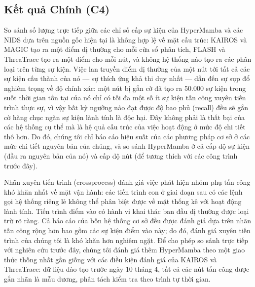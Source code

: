 \documentclass[letterpaper,twocolumn,10pt]{article}
\begin{document}
\subsection{Kết quả Chính (C4)}
\label{sec:main_results}

So sánh số lượng trực tiếp giữa các chỉ số cấp sự kiện của HyperMamba và các NIDS dựa trên nguồn gốc hiện tại là không hợp lệ về mặt cấu trúc: KAIROS và MAGIC tạo ra một điểm dị thường cho mỗi cửa sổ phân tích, FLASH và ThreaTrace tạo ra một điểm cho mỗi nút, và không hệ thống nào tạo ra các phân loại trên từng sự kiện. Việc lan truyền điểm dị thường của một nút tới tất cả các sự kiện cấu thành của nó --- sự thích ứng khả thi duy nhất --- dẫn đến sự sụp đổ nghiêm trọng về độ chính xác: một nút bị gắn cờ đã tạo ra 50.000 sự kiện trong suốt thời gian tồn tại của nó chỉ có tối đa một số ít sự kiện tấn công xuyên tiến trình thực sự, vì vậy bất kỳ ngưỡng nào đạt được độ bao phủ (recall) đều sẽ gắn cờ hàng chục ngàn sự kiện lành tính là độc hại. Đây không phải là thất bại của các hệ thống cụ thể mà là hệ quả cấu trúc của việc hoạt động ở mức độ chi tiết thô hơn. Do đó, chúng tôi chỉ báo cáo hiệu suất của các phương pháp cơ sở ở các mức chi tiết nguyên bản của chúng, và so sánh HyperMamba ở cả cấp độ sự kiện (đầu ra nguyên bản của nó) và cấp độ nút (để tương thích với các công trình trước đây).

Nhãn xuyên tiến trình (crossprocess) đánh giá việc phát hiện nhóm phụ tấn công khó khăn nhất về mặt vận hành: các tiến trình con ở giai đoạn sau có các lệnh gọi hệ thống riêng lẻ không thể phân biệt được về mặt thống kê với hoạt động lành tính. Tiến trình điểm vào có hành vi khai thác ban đầu dị thường được loại trừ rõ ràng. Cả báo cáo của bốn hệ thống cơ sở đều được đánh giá dựa trên nhãn tấn công rộng hơn bao gồm các sự kiện điểm vào này; do đó, đánh giá xuyên tiến trình của chúng tôi là khó khăn hơn nghiêm ngặt. Để cho phép so sánh trực tiếp với nghiên cứu trước đây, chúng tôi đánh giá thêm HyperMamba theo một giao thức thống nhất gần giống với các điều kiện đánh giá của KAIROS và ThreaTrace: dữ liệu đào tạo trước ngày 10 tháng 4, tất cả các nút tấn công được gắn nhãn là mẫu dương, phân tách kiểm tra theo trình tự thời gian.
\end{document}
